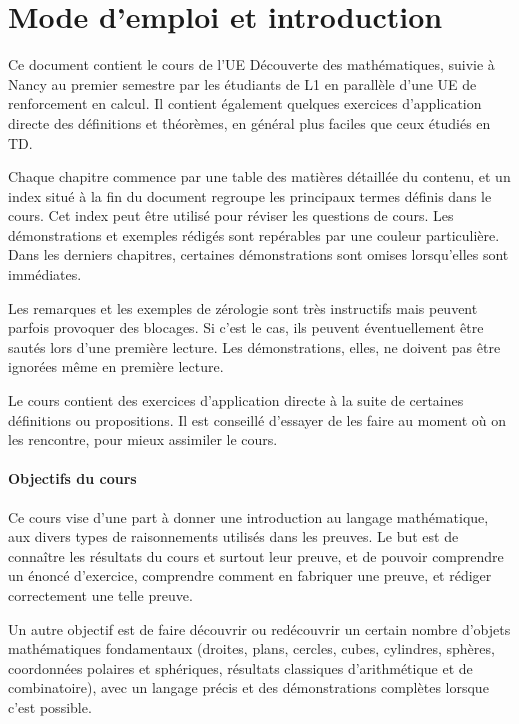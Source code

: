 \documentclass[11pt,a4paper]{book}
\theoremstyle{definition}
\theoremstyle{plain}
\begin{document}
\tableofcontents



\section{Mode d'emploi et introduction}

Ce document contient le cours de l'UE \og Découverte des mathématiques\fg{}, suivie à Nancy au premier semestre par les étudiants de L1 en parallèle d'une UE de renforcement en calcul. Il contient également quelques exercices d'application directe des définitions et théorèmes, en général plus faciles que ceux étudiés en TD.

Chaque chapitre commence par une table des matières détaillée du contenu, et un index situé à la fin du document regroupe les principaux termes définis dans le cours. Cet index peut être utilisé pour réviser les questions de cours. Les démonstrations et exemples rédigés sont repérables par une couleur particulière. Dans les derniers chapitres, certaines démonstrations sont omises lorsqu'elles sont immédiates.

Les remarques et les exemples de \og zérologie\fg{} sont très instructifs mais peuvent parfois provoquer des blocages. Si c'est le cas, ils peuvent éventuellement être sautés lors d'une première lecture. Les démonstrations, elles, ne doivent pas être ignorées même en première lecture.

Le cours contient des exercices d'application directe à la suite de certaines définitions ou propositions. Il est conseillé d'essayer de les faire au moment où on les rencontre, pour mieux assimiler le cours.

\paragraph{Objectifs du cours} Ce cours vise d'une part à donner une introduction au langage mathématique, aux divers types de raisonnements utilisés dans les preuves. Le but est de connaître les résultats du cours et surtout leur preuve, et de pouvoir comprendre un énoncé d'exercice, comprendre comment en fabriquer une preuve, et rédiger correctement une telle preuve. 

Un autre objectif est de faire découvrir ou redécouvrir un certain nombre d'objets mathématiques fondamentaux (droites, plans, cercles, cubes, cylindres, sphères, coordonnées polaires et sphériques, résultats classiques d'arithmétique et de combinatoire), avec un langage précis et des démonstrations complètes lorsque c'est possible.
\end{document}
